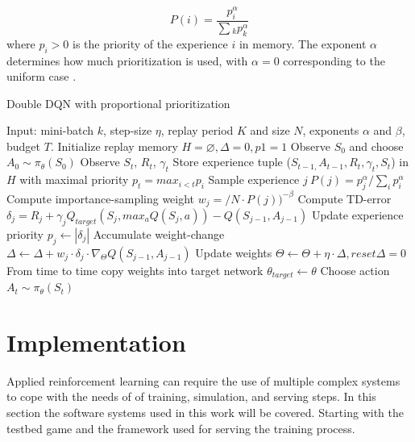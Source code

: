 \documentclass[12pt,a4paper]{article}
\begin{document}
\begin{equation}
    P(i) = \frac{p_i^\alpha}{\sum{_k p_k^\alpha}}
\end{equation}
where $p_i > 0$ is the priority of the experience $i$ in memory. The exponent $\alpha$ determines how much prioritization is used, with $\alpha = 0$ corresponding to the uniform case \cite{Schaul2016}.
\begin{algorithm}
    \label{alg:prioritizedReplay}
    \caption{Double DQN with proportional prioritization \cite{Schaul2016}}
    \begin{algorithmic}
    \State Input: mini-batch $k$, step-size $\eta$, replay period $K$ and size $N$, exponents $\alpha$ and $\beta$, budget $T$.
    \State Initialize replay memory $H = \varnothing, \Delta = 0, p1 = 1$
    \State Observe $S_0$ and choose $A_0 \sim \pi_\theta(S_0)$
        \State Observe $S_t$, $R_t$, $\gamma_t$
        \State Store experience tuple ($S_{t-1,} A_{t-1}, R_t, \gamma_t, S_t$) in $H$ with maximal priority $p_t = max_{i<t}p_i$
                \State Sample experience $j ~ P(j) = p^\alpha_j/\sum_i{p^\alpha_i}$
                \State Compute importance-sampling weight $w_j = / N \cdot P(j))^{-\beta}$
                \State Compute TD-error $\delta_j = R_j + \gamma_jQ_{target}(S_j, max_aQ(S_j,a)) - Q(S_{j-1},A_{j-1})$
                \State Update experience priority $p_j \leftarrow |\delta_j|$
                \State Accumulate weight-change $\Delta \leftarrow \Delta + w_j \cdot \delta_j \cdot \nabla_\Theta Q(S_{j-1}, A_{j-1})$
            \EndFor
            \State Update weights $\Theta \leftarrow \Theta + \eta \cdot \Delta, reset \Delta = 0$
            \State From time to time copy weights into target network $\theta_{target} \leftarrow \theta$
        \EndIf
        \State Choose action $A_t \sim \pi_\theta(S_t)$
    \EndFor
    \end{algorithmic}
\end{algorithm}

\section{Implementation}\label{sec:implementation}
Applied reinforcement learning can require the use of multiple complex systems to cope with the needs of of training, simulation, and serving steps. In this section the software systems used in this work will be covered. Starting with the testbed game and the framework used for serving the training process.
\end{document}
